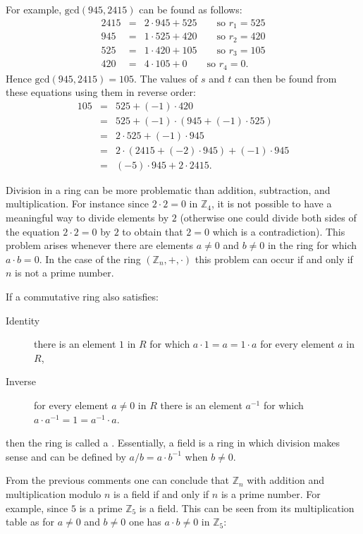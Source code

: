 For example, $\mbox{gcd}(945,2415)$ can be found as follows:
\begin{eqnarray*}
  2415 &=& 2\cdot945+525 \qquad\mbox{so $r_1=525$} \\
  945 &=& 1\cdot525+420 \qquad\mbox{so $r_2=420$} \\
  525 &=& 1\cdot420+105 \qquad\mbox{so $r_3=105$} \\
  420 &=& 4\cdot105+0 \qquad\mbox{so $r_4=0$}.
\end{eqnarray*}
Hence $\mbox{gcd}(945,2415)=105$.
The values of $s$ and $t$ can then be found from these equations using them in reverse order:
\begin{eqnarray*}
  105 &=& 525 + (-1)\cdot420 \\
  &=& 525 + (-1)\cdot(945+(-1)\cdot525) \\
  &=& 2\cdot525+(-1)\cdot945 \\
  &=& 2\cdot(2415+(-2)\cdot945)+(-1)\cdot945 \\
  &=& (-5)\cdot945+2\cdot2415.
\end{eqnarray*}

Division in a ring can be more problematic than addition, subtraction, and multiplication.
For instance since $2\cdot2=0$ in $\mathbb{Z}_4$, it is not possible to
have a meaningful way to divide elements by $2$ (otherwise one could divide both
sides of the equation $2\cdot2=0$ by $2$ to obtain that $2=0$ which is a contradiction).
This problem arises whenever there are elements $a\neq0$ and
$b\neq0$ in the ring for which $a\cdot b=0$.
In the case of the ring $(\mathbb{Z}_n,+,\cdot)$ this problem can occur if and only if
$n$ is not a prime number.

If a commutative ring also satisfies:
\begin{description}
  \item[Identity] there is an element $1$ in $R$ for which $a\cdot1=a=1\cdot a$
  for every element $a$ in $R$,
  \item[Inverse] for every element $a\neq0$ in $R$ there is an element $a^{-1}$
  for which $a\cdot a^{-1}=1=a^{-1}\cdot a$.
\end{description}
then the ring is called a . Essentially, a field is a ring in which division
makes sense and can be defined by $a/b=a\cdot b^{-1}$ when $b\neq0$.

From the previous comments one can conclude that $\mathbb{Z}_n$ with addition and
multiplication modulo $n$ is a field if and only if $n$ is a prime number.
For example, since $5$ is a prime $\mathbb{Z}_5$ is a field.
This can be seen from its multiplication table as for $a\neq0$ and $b\neq0$
one has $a\cdot b\neq0$ in $\mathbb{Z}_5$:


